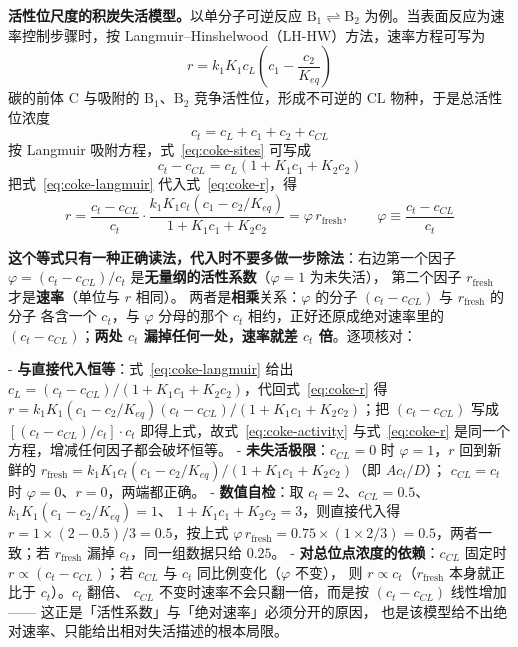 \begin{principle}
\textbf{活性位尺度的积炭失活模型。}以单分子可逆反应
$\mathrm{B_1\rightleftharpoons B_2}$ 为例。当表面反应为速率控制步骤时，按
Langmuir–Hinshelwood（LH-HW）方法，速率方程可写为
\begin{equation}
r=k_1K_1c_L\left(c_1-\frac{c_2}{K_{eq}}\right)
\label{eq:coke-r}
\end{equation}
碳的前体 C 与吸附的 $\mathrm{B_1}$、$\mathrm{B_2}$ 竞争活性位，形成不可逆的
$\mathrm{CL}$ 物种，于是总活性位浓度
\begin{equation}
c_t=c_L+c_1+c_2+c_{CL}
\label{eq:coke-sites}
\end{equation}
按 Langmuir 吸附方程，式~\eqref{eq:coke-sites} 可写成
\begin{equation}
c_t-c_{CL}=c_L(1+K_1c_1+K_2c_2)
\label{eq:coke-langmuir}
\end{equation}
把式~\eqref{eq:coke-langmuir} 代入式~\eqref{eq:coke-r}，得
\begin{equation}
r=\frac{c_t-c_{CL}}{c_t}\cdot
\frac{k_1K_1c_t\left(c_1-c_2/K_{eq}\right)}{1+K_1c_1+K_2c_2}
=\varphi\,r_{\text{fresh}},\qquad
\varphi\equiv\frac{c_t-c_{CL}}{c_t}
\label{eq:coke-activity}
\end{equation}

\textbf{这个等式只有一种正确读法，代入时不要多做一步除法}：右边第一个因子
$\varphi=(c_t-c_{CL})/c_t$ 是\textbf{无量纲的活性系数}（$\varphi=1$ 为未失活），
第二个因子 $r_{\text{fresh}}$ 才是\textbf{速率}（单位与 $r$ 相同）。
两者是\textbf{相乘}关系：$\varphi$ 的分子 $(c_t-c_{CL})$ 与 $r_{\text{fresh}}$ 的分子
各含一个 $c_t$，与 $\varphi$ 分母的那个 $c_t$ 相约，正好还原成绝对速率里的
$(c_t-c_{CL})$；\textbf{两处 $c_t$ 漏掉任何一处，速率就差 $c_t$ 倍}。逐项核对：

- \textbf{与直接代入恒等}：式~\eqref{eq:coke-langmuir} 给出
  $c_L=(c_t-c_{CL})/(1+K_1c_1+K_2c_2)$，代回式~\eqref{eq:coke-r} 得
  $r=k_1K_1(c_1-c_2/K_{eq})(c_t-c_{CL})/(1+K_1c_1+K_2c_2)$；把 $(c_t-c_{CL})$ 写成
  $\left[(c_t-c_{CL})/c_t\right]\cdot c_t$ 即得上式，故式~\eqref{eq:coke-activity}
  与式~\eqref{eq:coke-r} 是同一个方程，增减任何因子都会破坏恒等。
- \textbf{未失活极限}：$c_{CL}=0$ 时 $\varphi=1$，$r$ 回到新鲜的
  $r_{\text{fresh}}=k_1K_1c_t(c_1-c_2/K_{eq})/(1+K_1c_1+K_2c_2)$（即 $Ac_t/D$）；
  $c_{CL}=c_t$ 时 $\varphi=0$、$r=0$，两端都正确。
- \textbf{数值自检}：取 $c_t=2$、$c_{CL}=0.5$、$k_1K_1(c_1-c_2/K_{eq})=1$、
  $1+K_1c_1+K_2c_2=3$，则直接代入得 $r=1\times(2-0.5)/3=0.5$，按上式
  $\varphi\,r_{\text{fresh}}=0.75\times(1\times2/3)=0.5$，两者一致；若
  $r_{\text{fresh}}$ 漏掉 $c_t$，同一组数据只给 $0.25$。
- \textbf{对总位点浓度的依赖}：$c_{CL}$ 固定时
  $r\propto(c_t-c_{CL})$；若 $c_{CL}$ 与 $c_t$ 同比例变化（$\varphi$ 不变），
  则 $r\propto c_t$（$r_{\text{fresh}}$ 本身就正比于 $c_t$）。$c_t$ 翻倍、
  $c_{CL}$ 不变时速率不会只翻一倍，而是按 $(c_t-c_{CL})$ 线性增加——
  这正是「活性系数」与「绝对速率」必须分开的原因，
  也是该模型给不出绝对速率、只能给出相对失活描述的根本局限。


\end{principle}
